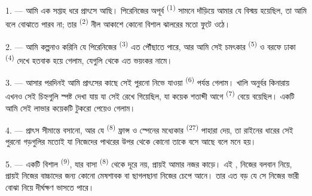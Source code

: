 %

\VUsaut{4.0mm}
\VUsaut{3.0mm}

\VUsaut{3.0mm}

\VUsaut{3.0mm}

1. --- আমি এক সপ্তাহ ধরে প্রাৎসে আছি। পিরেনিজের অপূর্ব 
\textsuperscript{(1)} সামনে দাঁড়িয়ে আমার যে বিস্ময় হয়েছিল, তা আমি বলে বোঝাতে
পারব না; তার  \textsuperscript{(2)} নীল আকাশে কোনো বিশাল
ঝালরের মতো ফুটে ওঠে।

2. --- আমি কল্পনাও করিনি যে পিরেনিজের  \textsuperscript{(3)} এত
 পৌঁছাতে পারে, আর আমি সেই চমৎকার 
\textsuperscript{(5)} ও বরফে ঢাকা  \textsuperscript{(4)} দেখে হতবাক
হয়ে গেলাম, যেগুলি থেকে এত ভয়ংকর  নামে।

\VUsaut{3.0mm}
\VUsaut{3.0mm}

3. --- আসার পরদিনই আমি প্রাৎসের কাছে সেই পুরনো নিভে যাওয়া 
\textsuperscript{(6)} পর্যন্ত গেলাম।  খালি অনুর্বর কিনারায়
এখনও সেই চিহ্নগুলি স্পষ্ট দেখা যায় যা সেই  রেখে গিয়েছিল, যা
কয়েক শতাব্দী আগে  \textsuperscript{(7)} বেয়ে বয়েছিল।
একটি  আমি সেই লাভার কয়েকটি টুকরো পেয়েও গেলাম।

4. --- প্রাৎস সীমান্তে বসানো, আর যে  \textsuperscript{(8)} ফ্রান্স
ও স্পেনের মধ্যেকার  \textsuperscript{(27)} পাহারা দেয়, তা রাইনের
ধারের সেই পুরনো গড়গুলির মতোই যা নিজেদের পাথরের উপর থেকে কোনো 
তাকে বসে আছে বলে মনে হয়।

5. --- একটি বিশাল  \textsuperscript{(9)}, যার বাসা 
\textsuperscript{(8)} থেকে দূরে নয়, প্রায়ই আমার নজর কাড়ে। এই
, নিজের বলবান  নিয়ে, প্রায়ই নিজের বাচ্চাদের
জন্য কোনো মেষশাবক বা ছাগলছানা নিজের  চেপে আনে। তার
 এত বড় যে সে নিজের ভারী বোঝা নিয়ে দীর্ঘক্ষণ ভাসতে পারে।

